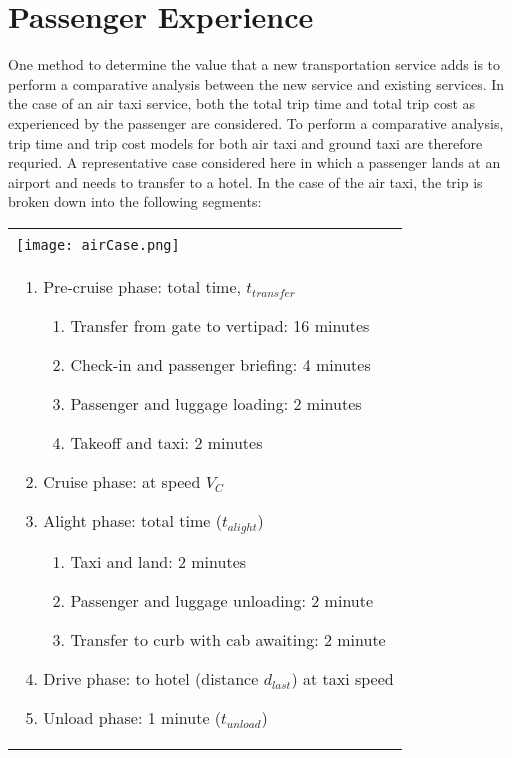 \documentclass[12pt, letter]{article}
\begin{document}
\section{Passenger Experience}
One method to determine the value that a new transportation service adds is to perform a comparative analysis between the new service and existing services. In the case of an air taxi service, both the total trip time and total trip cost as experienced by the passenger are considered. To perform a comparative analysis, trip time and trip cost models for both air taxi and ground taxi are therefore requried. A representative case considered here in which a passenger lands at an airport and needs to transfer to a hotel. In the case of the air taxi, the trip is broken down into the following segments:
\begin{table}[H]
	\begin{tabular}{|p{5in}|}
	\hline
		\\\texttt{[image: airCase.png]}\\
		\begin{enumerate}
			\item Pre-cruise phase: total time, $t_{transfer}$
			\begin{enumerate}
			  \item Transfer from gate to vertipad: 16 minutes
				\item Check-in and passenger briefing: 4 minutes
				\item Passenger and luggage loading: 2 minutes
				\item Takeoff and taxi: 2 minutes
			\end{enumerate}
			\item Cruise phase: at speed $V_C$
			\item Alight phase: total time ($t_{alight}$)
			\begin{enumerate}
				\item Taxi and land: 2 minutes
				\item Passenger and luggage unloading: 2 minute
				\item Transfer to curb with cab awaiting: 2 minute
			\end{enumerate}
			\item Drive phase: to hotel (distance $d_{last}$) at taxi speed
			\item Unload phase: 1 minute ($t_{unload}$)
		\end{enumerate}
	\\ \hline
	\end{tabular}
\end{table}
\end{document}
